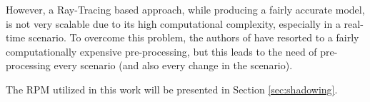 \begin{enumerate}
\begin{enumerate}
		
		However, a Ray-Tracing based approach, while producing a fairly accurate model, is not very scalable due to its high computational complexity, especially in a real-time scenario. To overcome this problem, the authors of \cite{STEPANOV200861} have resorted to a fairly computationally expensive pre-processing, but this leads to the need of pre-processing every scenario (and also every change in the scenario).
		
		
		The RPM utilized in this work will be presented in Section \ref{sec:shadowing}.
	
		
			
		\end{enumerate}
		
		\end{enumerate}
